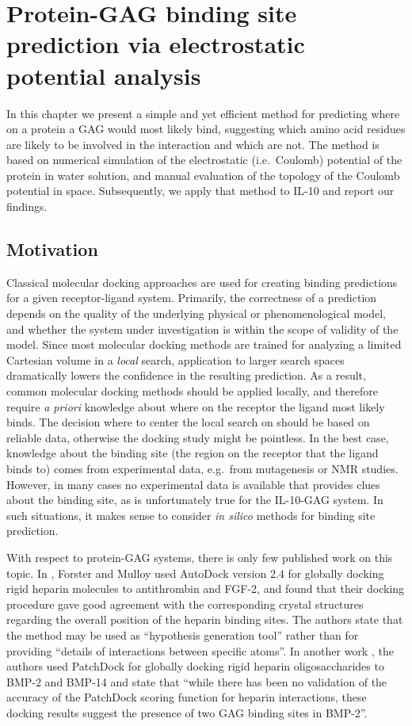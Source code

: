 \chapter{Protein-GAG binding site prediction via electrostatic potential analysis}

In this chapter we present a simple and yet efficient method for predicting
where on a protein a GAG would most likely bind, suggesting which amino acid
residues are likely to be involved in the interaction and which are not. The
method is based on numerical simulation of the electrostatic (i.e.\ Coulomb)
potential of the protein in water solution, and manual evaluation of the
topology of the Coulomb potential in space. Subsequently, we apply that method
to IL-10 and report our findings.

\section{Motivation}

Classical molecular docking approaches are used for creating binding predictions
for a given receptor-ligand system. Primarily, the correctness of a prediction
depends on the quality of the underlying physical or phenomenological model, and
whether the system under investigation is within the scope of validity of the
model. Since most molecular docking methods are trained for analyzing a limited
Cartesian volume in a \textit{local} search, application to larger search spaces
dramatically lowers the confidence in the resulting prediction. As a result,
common molecular docking methods should be applied locally, and therefore
require \textit{a priori} knowledge about where on the receptor the ligand most
likely binds. The decision where to center the local search on should be based
on reliable data, otherwise the docking study might be pointless. In the best
case, knowledge about the binding site (the region on the receptor that the
ligand binds to) comes from experimental data, e.g.\ from mutagenesis or NMR
studies. However, in many cases no experimental data is available that provides
clues about the binding site, as is unfortunately true for the IL-10-GAG system.
In such situations, it makes sense to consider \textit{in silico} methods for
binding site prediction.

With respect to protein-GAG systems, there is only few published work on this
topic. In \cite{hp_binding_sites_mulloy_2006}, Forster and Mulloy used AutoDock
version 2.4 \cite{autodock24} for globally docking rigid heparin molecules to
antithrombin and FGF-2, and found that their docking procedure gave good
agreement with the corresponding crystal structures regarding the overall
position of the heparin binding sites. The authors state that the method may be
used as \enquote{hypothesis generation tool} rather than for providing
\enquote{details of interactions between specific atoms}. In another work
\cite{gandhi_bmp_heparin_binding_sites_2012}, the authors used PatchDock
\cite{patchdock_2002} for globally docking rigid heparin oligosaccharides to
BMP-2 and BMP-14 and state that \enquote{while there has been no validation of
the accuracy of the PatchDock scoring function for heparin interactions, these
docking results suggest the presence of two GAG binding sites in BMP-2}.

